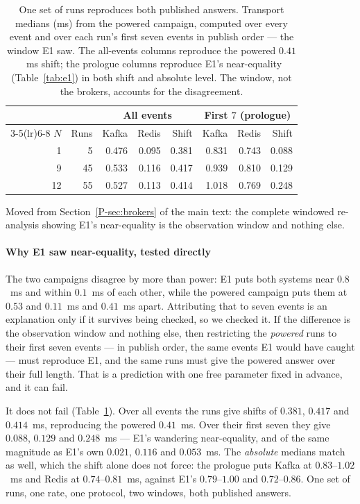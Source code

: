 \documentclass[10pt,journal,onecolumn]{IEEEtran}
\newcommand{\kafka}{Kafka}
\newcommand{\redis}{Redis}
\newcommand{\mainBrokers}{\ref{P-sec:brokers}}        %
\begin{document}
\begin{table}[t]
\caption[One set of runs reproduces both published answers]{One set of runs reproduces both published answers. Transport medians (ms) from the powered
campaign, computed over every event and over each run's first seven events in publish order ---
the window E1 saw. The all-events columns reproduce the powered $0.41$~ms shift; the prologue
columns reproduce E1's near-equality (Table~\ref{tab:e1}) in both shift and absolute level. The
window, not the brokers, accounts for the disagreement.}
\label{tab:e1rep}
\begin{tabular}{rrrrrrrr}
\toprule
& & \multicolumn{3}{c}{All events} & \multicolumn{3}{c}{First $7$ (prologue)} \\
\cmidrule(lr){3-5}\cmidrule(lr){6-8}
$N$ & Runs & \kafka{} & \redis{} & Shift & \kafka{} & \redis{} & Shift \\
\midrule
1  & 5  & 0.476 & 0.095 & 0.381 & 0.831 & 0.743 & 0.088 \\
9  & 45 & 0.533 & 0.116 & 0.417 & 0.939 & 0.810 & 0.129 \\
12 & 55 & 0.527 & 0.113 & 0.414 & 1.018 & 0.769 & 0.248 \\
\bottomrule
\end{tabular}
\end{table}

Moved from Section~\mainBrokers{} of the main text: the complete windowed re-analysis showing E1's near-equality is the observation window and nothing else.

\paragraph{Why E1 saw near-equality, tested directly} The two campaigns disagree by more than
power: E1 puts both systems near $0.8$~ms and within $0.1$~ms of each other, while the powered
campaign puts them at $0.53$ and $0.11$~ms and $0.41$~ms apart. Attributing that to seven events
is an explanation only if it survives being checked, so we checked it. If the difference is the
observation window and nothing else, then restricting the \emph{powered} runs to their first seven
events --- in publish order, the same events E1 would have caught --- must reproduce E1, and the
same runs must give the powered answer over their full length. That is a prediction with one free
parameter fixed in advance, and it can fail.

It does not fail (Table~\ref{tab:e1rep}). Over all events the runs give shifts of $0.381$,
$0.417$ and $0.414$~ms, reproducing the powered $0.41$~ms. Over their first seven they give
$0.088$, $0.129$ and $0.248$~ms --- E1's wandering near-equality, and of the same magnitude as
E1's own $0.021$, $0.116$ and $0.053$~ms. The \emph{absolute} medians match as well, which the
shift alone does not force: the prologue puts \kafka{} at $0.83$--$1.02$~ms and \redis{} at
$0.74$--$0.81$~ms, against E1's $0.79$--$1.00$ and $0.72$--$0.86$. One set of runs, one rate, one
protocol, two windows, both published answers.
\end{document}
